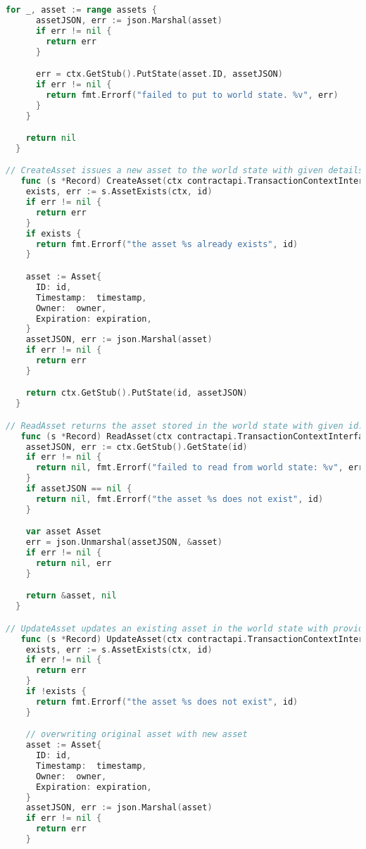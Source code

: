 \begin{lstlisting}[language=Go, caption={Chaincode representing immunisation records.}]
    for _, asset := range assets {
      assetJSON, err := json.Marshal(asset)
      if err != nil {
        return err
      }

      err = ctx.GetStub().PutState(asset.ID, assetJSON)
      if err != nil {
        return fmt.Errorf("failed to put to world state. %v", err)
      }
    }

    return nil
  }

// CreateAsset issues a new asset to the world state with given details.
   func (s *Record) CreateAsset(ctx contractapi.TransactionContextInterface, id string, timestamp string, owner string, expiration uint64) error {
    exists, err := s.AssetExists(ctx, id)
    if err != nil {
      return err
    }
    if exists {
      return fmt.Errorf("the asset %s already exists", id)
    }

    asset := Asset{
      ID: id,
      Timestamp:  timestamp,
      Owner:  owner,
      Expiration: expiration,
    }
    assetJSON, err := json.Marshal(asset)
    if err != nil {
      return err
    }

    return ctx.GetStub().PutState(id, assetJSON)
  }

// ReadAsset returns the asset stored in the world state with given id.
   func (s *Record) ReadAsset(ctx contractapi.TransactionContextInterface, id string) (*Asset, error) {
    assetJSON, err := ctx.GetStub().GetState(id)
    if err != nil {
      return nil, fmt.Errorf("failed to read from world state: %v", err)
    }
    if assetJSON == nil {
      return nil, fmt.Errorf("the asset %s does not exist", id)
    }

    var asset Asset
    err = json.Unmarshal(assetJSON, &asset)
    if err != nil {
      return nil, err
    }

    return &asset, nil
  }

// UpdateAsset updates an existing asset in the world state with provided parameters.
   func (s *Record) UpdateAsset(ctx contractapi.TransactionContextInterface, id string, timestamp string, owner string, expiration uint64) error {
    exists, err := s.AssetExists(ctx, id)
    if err != nil {
      return err
    }
    if !exists {
      return fmt.Errorf("the asset %s does not exist", id)
    }

    // overwriting original asset with new asset
    asset := Asset{
      ID: id,
      Timestamp:  timestamp,
      Owner:  owner,
      Expiration: expiration,
    }
    assetJSON, err := json.Marshal(asset)
    if err != nil {
      return err
    }


\end{lstlisting}
